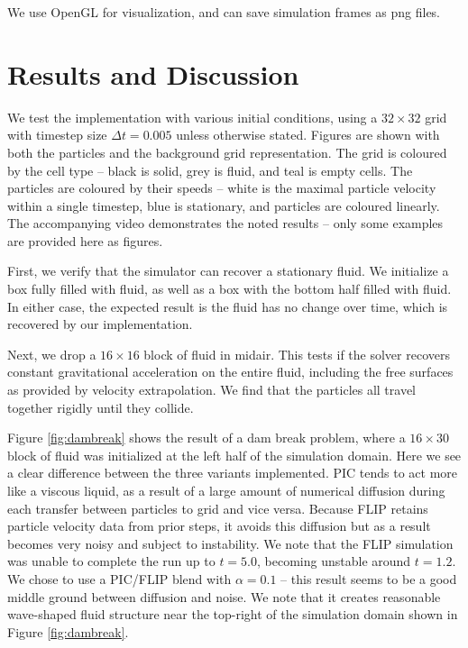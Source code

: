\documentclass[sigconf]{acmart}
\begin{document}
We use OpenGL for visualization, and can save simulation frames as png files.

\section{Results and Discussion}

We test the implementation with various initial conditions, using a $32\times{}32$ grid with timestep size $\Delta{}t=0.005$ unless otherwise stated. Figures are shown with both the particles and the background grid representation. The grid is coloured by the cell type -- black is solid, grey is fluid, and teal is empty cells. The particles are coloured by their speeds -- white is the maximal particle velocity within a single timestep, blue is stationary, and particles are coloured linearly. The accompanying video demonstrates the noted results -- only some examples are provided here as figures.

First, we verify that the simulator can recover a stationary fluid. We initialize a box fully filled with fluid, as well as a box with the bottom half filled with fluid. In either case, the expected result is the fluid has no change over time, which is recovered by our implementation.

Next, we drop a $16\times{}16$ block of fluid in midair. This tests if the solver recovers constant gravitational acceleration on the entire fluid, including the free surfaces as provided by velocity extrapolation. We find that the particles all travel together rigidly until they collide.

Figure \ref{fig:dambreak} shows the result of a dam break problem, where a $16\times{}30$ block of fluid was initialized at the left half of the simulation domain. Here we see a clear difference between the three variants implemented. PIC tends to act more like a viscous liquid, as a result of a large amount of numerical diffusion during each transfer between particles to grid and vice versa. Because FLIP retains particle velocity data from prior steps, it avoids this diffusion but as a result becomes very noisy and subject to instability. We note that the FLIP simulation was unable to complete the run up to $t=5.0$, becoming unstable around $t=1.2$. We chose to use a PIC/FLIP blend with $\alpha=0.1$ -- this result seems to be a good middle ground between diffusion and noise. We note that it creates reasonable wave-shaped fluid structure near the top-right of the simulation domain shown in Figure \ref{fig:dambreak}.
\end{document}
